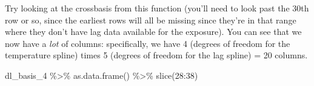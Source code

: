\documentclass[
]{book}
\newenvironment{Shaded}{\begin{snugshade}}{\end{snugshade}}
\newcommand{\DecValTok}[1]{\textcolor[rgb]{0.00,0.00,0.81}{#1}}
\newcommand{\FunctionTok}[1]{\textcolor[rgb]{0.00,0.00,0.00}{#1}}
\newcommand{\NormalTok}[1]{#1}
\newcommand{\SpecialCharTok}[1]{\textcolor[rgb]{0.00,0.00,0.00}{#1}}
\begin{document}
Try looking at the crossbasis from this function (you'll need to look past the 30th row
or so, since the earliest rows will all be missing since they're in that range where
they don't have lag data available for the exposure). You can see that we now have a
\emph{lot} of columns: specifically, we have 4 (degrees of freedom for the temperature spline)
times 5 (degrees of freedom for the lag spline) = 20 columns.

\begin{Shaded}
\begin{Highlighting}[]
\NormalTok{dl\_basis\_4 }\SpecialCharTok{\%\textgreater{}\%} 
  \FunctionTok{as.data.frame}\NormalTok{() }\SpecialCharTok{\%\textgreater{}\%} 
  \FunctionTok{slice}\NormalTok{(}\DecValTok{28}\SpecialCharTok{:}\DecValTok{38}\NormalTok{)}
\end{Highlighting}
\end{Shaded}
\end{document}

